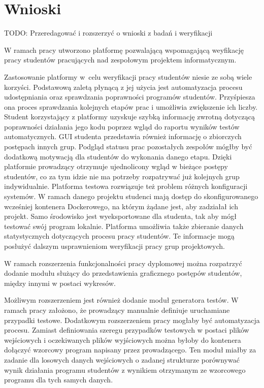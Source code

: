 \chapter{Wnioski}
\label{chapter:conclusion}

TODO: Przeredagować i rozszerzyć o wnioski z badań i weryfikacji

W ramach pracy utworzono platformę pozwalającą wspomagającą weyfikację pracy studentów pracujących nad zespołowym projektem informatycznym.



Zastosowanie platformy w~celu weryfikacji pracy studentów niesie ze sobą wiele korzyści.
Podstawową zaletą płynącą z jej użycia jest automatyzacja procesu udostępniania oraz sprawdzania poprawności programów studentów.
Przyśpiesza ona proces sprawdzania kolejnych etapów prac i umożliwia zwiększenie ich liczby.
Student korzystający z platformy uzyskuje szybką informację zwrotną dotyczącą poprawności działania jego kodu poprzez wgląd do raportu wyników testów automatycznych.
GUI studenta przedstawia również informację o zbiorczych postępach innych grup.
Podgląd statusu prac pozostałych zespołów mógłby być dodatkową motywacją dla studentów do wykonania danego etapu.
Dzięki platformie prowadzący otrzymuje ujednolicony wgląd w bieżące postępy studentów, co za tym idzie nie ma potrzeby rozpatrywać już kolejnych grup indywidualnie.
Platforma testowa rozwiązuje też problem różnych konfiguracji systemów.
W ramach danego projektu studenci mają dostęp do skonfigurowanego wcześniej kontenera Dockerowego, na którym żądane jest, aby zadziałał ich projekt.
Samo środowisko jest wyeksportowane dla studenta, tak aby mógł testować swój program lokalnie.
Platforma umożliwia także zbieranie danych statystycznych dotyczących procesu pracy studentów.
Te informacje mogą posłużyć dalszym usprawnieniom weryfikacji pracy grup projektowych.

W ramach rozszerzenia funkcjonalności pracy dyplomowej można rozpatrzyć dodanie modułu służący do przedstawienia graficznego postępów studentów, między innymi w postaci wykresów.

Możliwym rozszerzeniem jest również dodanie moduł generatora testów.
W ramach pracy założono, że prowadzący manualnie definiuje uruchamiane przypadki testowe.
Dodatkowym rozszerzeniem pracy mogłaby być automatyzacja procesu.
Zamiast definiowania szeregu przypadków testowych w postaci plików wejściowych i oczekiwanych plików wyjściowych można byłoby do kontenera dołączyć wzorcowy program napisany przez prowadzącego.
Ten moduł miałby za zadanie dla losowych danych wejściowych o zadanej strukturze porównywać wynik działania programu studentów z wynikiem otrzymanym ze wzorcowego programu dla tych samych danych.



